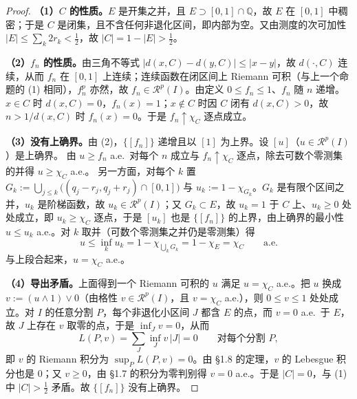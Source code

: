 \documentclass[oneside]{book}
\theoremstyle{definition}
\newcommand{\Rc}{\mathcal{R}}
\providecommand{\Q}{\mathbb{Q}}
\theoremstyle{definition}
\begin{document}
	\begin{proof}
		\textbf{（1）$C$ 的性质。}$E$ 是开集之并，且 $E\supset[0,1]\cap\Q$，故 $E$ 在 $[0,1]$ 中稠密；于是 $C$ 是闭集，且不含任何非退化区间，即内部为空。又由测度的次可加性 $|E|\leqslant\sum_k2r_k<\frac12$，故 $|C|=1-|E|>\frac12$。
		
		\textbf{（2）$f_n$ 的性质。}由三角不等式 $|d(x,C)-d(y,C)|\leqslant|x-y|$，故 $d(\cdot,C)$ 连续，从而 $f_n$ 在 $[0,1]$ 上连续；连续函数在闭区间上 Riemann 可积（与上一个命题的 (1) 相同），$f_n^p$ 亦然，故 $f_n\in\Rc^p(I)$。由定义 $0\leqslant f_n\leqslant1$、$f_n$ 随 $n$ 递增。$x\in C$ 时 $d(x,C)=0$，$f_n(x)=1$；$x\notin C$ 时因 $C$ 闭有 $d(x,C)>0$，故 $n>1/d(x,C)$ 时 $f_n(x)=0$。于是 $f_n\uparrow\chi_C$ 逐点成立。
		
		\textbf{（3）没有上确界。}由 (2)，$\{[f_n]\}$ 递增且以 $[1]$ 为上界。设 $[u]$（$u\in\Rc^p(I)$）是上确界。
		由 $u\geqslant f_n$ a.e.\ 对每个 $n$ 成立与 $f_n\uparrow\chi_C$ 逐点，除去可数个零测集的并得 $u\geqslant\chi_C$ a.e.。
		另一方面，对每个 $k$ 置 $G_k:=\bigcup_{j\leqslant k}\bigl((q_j-r_j,q_j+r_j)\cap[0,1]\bigr)$ 与 $u_k:=1-\chi_{G_k}$。$G_k$ 是有限个区间之并，$u_k$ 是阶梯函数，故 $u_k\in\Rc^p(I)$；又 $G_k\subset E$，故 $u_k=1$ 于 $C$ 上、$u_k\geqslant0$ 处处成立，即 $u_k\geqslant\chi_C$ 逐点，于是 $[u_k]$ 也是 $\{[f_n]\}$ 的上界，由上确界的最小性 $u\leqslant u_k$ a.e.。对 $k$ 取并（可数个零测集之并仍是零测集）得
		\[
		u\leqslant\inf_{k}u_k=1-\chi_{\bigcup_kG_k}=1-\chi_E=\chi_C\qquad\text{a.e.}
		\]
		与上段合起来，$u=\chi_C$ a.e.。
		
		\textbf{（4）导出矛盾。}上面得到一个 Riemann 可积的 $u$ 满足 $u=\chi_C$ a.e.。把 $u$ 换成 $v:=(u\wedge1)\vee0$（由格性 $v\in\Rc^p(I)$，且 $v=\chi_C$ a.e.），则 $0\leqslant v\leqslant1$ 处处成立。对 $I$ 的任意分割 $P$，每个非退化小区间 $J$ 都含 $E$ 的点，而 $v=0$ a.e.\ 于 $E$，故 $J$ 上存在 $v$ 取零的点，于是 $\inf_Jv=0$，从而
		\[
		L(P,v)=\sum_J\inf_Jv\,|J|=0\qquad\text{对每个分割 }P ,
		\]
		即 $v$ 的 Riemann 积分为 $\sup_PL(P,v)=0$。由 §1.8 的定理，$v$ 的 Lebesgue 积分也是 $0$；又 $v\geqslant0$，由 §1.7 的积分为零判别得 $v=0$ a.e.。于是 $|C|=0$，与 (1) 中 $|C|>\frac12$ 矛盾。故 $\{[f_n]\}$ 没有上确界。
	\end{proof}
	
\end{document}
